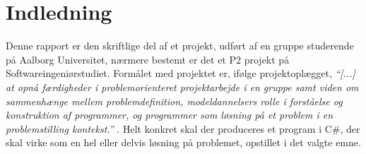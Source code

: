 \chapter{Indledning}\label{chap:indledning}



Denne rapport er den skriftlige del af et projekt, udført af en gruppe studerende på Aalborg Universitet, nærmere bestemt er det et P2 projekt på Softwareingeniørstudiet. 
Formålet med projektet er, ifølge projektoplægget, \textit{``[...] at opnå færdigheder i problemorienteret projektarbejde i en gruppe samt viden om sammenhænge mellem problemdefinition, modeldannelsers rolle i forståelse og konstruktion af programmer, og programmer som løsning på et problem i en problemstilling kontekst.''} \citep{projektkatalog}. 
Helt konkret skal der produceres et program i C\#, der skal virke som en hel eller delvis løsning på problemet, opstillet i det valgte emne.

